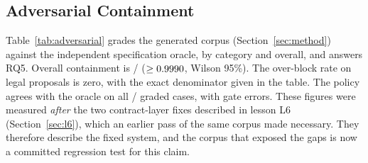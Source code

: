 \subsection{Adversarial Containment}

\begin{table}[t]
\centering
\caption{Adversarial Corpus Graded Against the Independent Specification Oracle, by Category}
\label{tab:adversarial}
\scriptsize

\end{table}

Table~\ref{tab:adversarial} grades the generated corpus (Section~\ref{sec:method}) against the
independent specification oracle, by category and overall, and answers RQ5. Overall containment is
\NAdversarialContained{}/\NAdversarialUnsafe{} ($\geq0.9990{}$, Wilson 95\%). The
over-block rate on legal proposals is zero, with the exact denominator given in the table. The policy
agrees with the oracle on all \NAdversarialCases{}/\NAdversarialCases{} graded cases, with
\NAdversarialGateErrors{} gate errors. These figures were measured \emph{after} the two
contract-layer fixes described in lesson L6 (Section~\ref{sec:l6}), which an earlier pass of the
same corpus made necessary. They therefore describe the fixed system, and the corpus that exposed the
gaps is now a committed regression test for this claim.
